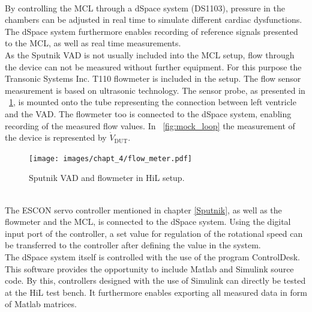 \\By controlling the MCL through a dSpace system (DS1103), pressure in the chambers can be adjusted in real time to simulate different cardiac dysfunctions. The dSpace system furthermore enables recording of reference signals presented to the MCL, as well as real time measurements.
\\As the Sputnik VAD is not usually included into the MCL setup, flow through the device can not be measured without further equipment. For this purpose the Transonic Systems Inc. T110 flowmeter is included in the setup. The flow sensor measurement is based on ultrasonic technology. The sensor probe, as presented in \figurename~\ref{fig:flow_meter_tube}, is mounted onto the tube representing the connection between left ventricle and the VAD. The flowmeter too is connected to the dSpace system, enabling recording of the measured flow values. In \figurename~\ref{fig:mock_loop} the measurement of the device is represented by $\dot{V}_{\mathrm{DUT}}$.
\begin{figure}[ht]
  \centering
  \texttt{[image: images/chapt\_4/flow\_meter.pdf]}
  \caption[Sputnik VAD and flowmeter in HiL setup]{Sputnik VAD and flowmeter in HiL setup.}
  \label{fig:flow_meter_tube}
\end{figure}
\\The ESCON servo controller mentioned in chapter \ref{Sputnik}, as well as the flowmeter and the MCL, is connected to the dSpace system. Using the digital input port of the controller, a set value for regulation of the rotational speed can be transferred to the controller after defining the value in the system.
\\The dSpace system itself is controlled with the use of the program ControlDesk. This software provides the opportunity to include Matlab and Simulink source code. By this, controllers designed with the use of Simulink can directly be tested at the HiL test bench. It furthermore enables exporting all measured data in form of Matlab matrices.

